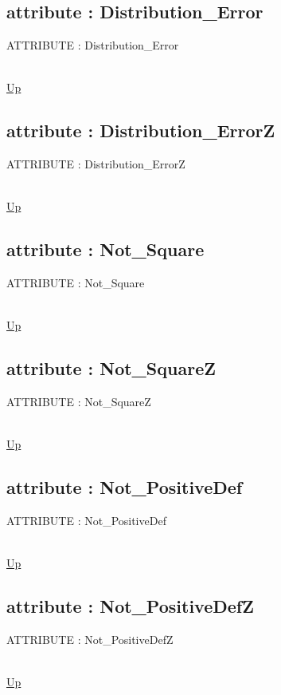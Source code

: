 \subsection*{attribute : Distribution\_Error}
\hypertarget{ecldoc:pbblas.constants.distribution_error}{ATTRIBUTE : Distribution\_Error} \\
\hyperlink{ecldoc:PBblas.Constants}{Up} \\
\par
\subsection*{attribute : Distribution\_ErrorZ}
\hypertarget{ecldoc:pbblas.constants.distribution_errorz}{ATTRIBUTE : Distribution\_ErrorZ} \\
\hyperlink{ecldoc:PBblas.Constants}{Up} \\
\par
\subsection*{attribute : Not\_Square}
\hypertarget{ecldoc:pbblas.constants.not_square}{ATTRIBUTE : Not\_Square} \\
\hyperlink{ecldoc:PBblas.Constants}{Up} \\
\par
\subsection*{attribute : Not\_SquareZ}
\hypertarget{ecldoc:pbblas.constants.not_squarez}{ATTRIBUTE : Not\_SquareZ} \\
\hyperlink{ecldoc:PBblas.Constants}{Up} \\
\par
\subsection*{attribute : Not\_PositiveDef}
\hypertarget{ecldoc:pbblas.constants.not_positivedef}{ATTRIBUTE : Not\_PositiveDef} \\
\hyperlink{ecldoc:PBblas.Constants}{Up} \\
\par
\subsection*{attribute : Not\_PositiveDefZ}
\hypertarget{ecldoc:pbblas.constants.not_positivedefz}{ATTRIBUTE : Not\_PositiveDefZ} \\
\hyperlink{ecldoc:PBblas.Constants}{Up} \\
\par
